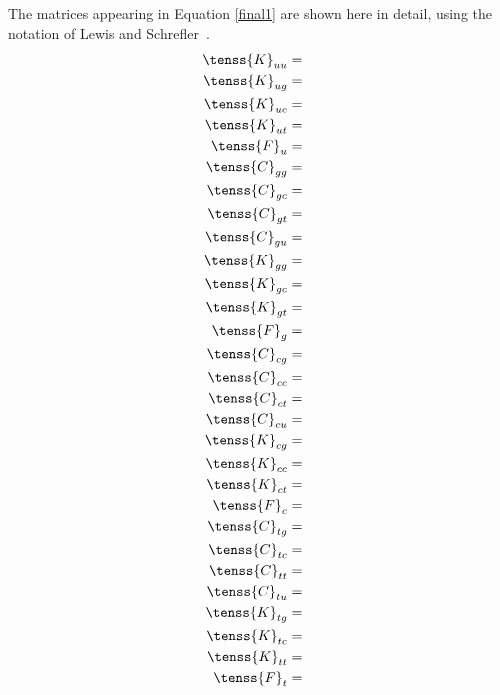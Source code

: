 The matrices appearing in Equation \eqref{final1} are shown here in detail, using the notation of Lewis and Schrefler~\cite{lewis}.
\begin{eqnarray}
\tenss{K}_{uu} &=&\\
\tenss{K}_{ug} &=&\\
\tenss{K}_{uc} &=&\\
\tenss{K}_{ut} &=&\\
\tenss{F}_u &=&\\
\tenss{C}_{gg} &=&\\
\tenss{C}_{gc} &=&\\
\tenss{C}_{gt} &=&\\
\tenss{C}_{gu} &=&\\ 
\tenss{K}_{gg} &=&\\
\tenss{K}_{gc} &=&\\
\tenss{K}_{gt} &=&\\
\tenss{F}_g &=&\\
\tenss{C}_{cg} &=&\\
\tenss{C}_{cc} &=&\\
\tenss{C}_{ct} &=&\\
\tenss{C}_{cu} &=&\\ 
\tenss{K}_{cg} &=&\\
\tenss{K}_{cc} &=&\\
\tenss{K}_{ct} &=&\\
\tenss{F}_c &=&\\
\tenss{C}_{tg} &=&\\
\tenss{C}_{tc} &=&\\
\tenss{C}_{tt} &=&\\
\tenss{C}_{tu} &=&\\ 
\tenss{K}_{tg} &=&\\
\tenss{K}_{tc} &=&\\
\tenss{K}_{tt} &=&\\
\tenss{F}_t &=&
\end{eqnarray}

